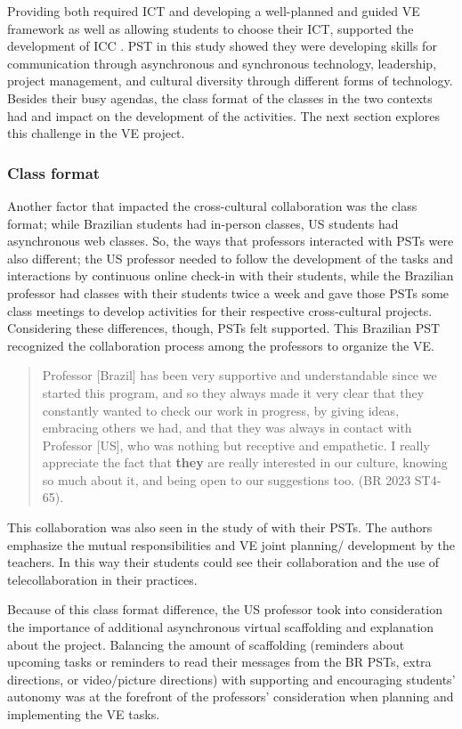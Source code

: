 Providing both required ICT and developing a well-planned and guided VE
framework \cite{gleason2021design} as well as allowing
students to choose their ICT, supported the development of ICC \cite{kolm2022international}. PST in this study showed they were developing
skills for communication through asynchronous and synchronous
technology, leadership, project management, and cultural diversity
through different forms of technology. Besides their busy agendas, the
class format of the classes in the two contexts had and impact on the
development of the activities. The next section explores this challenge
in the VE project.

\subsubsection{Class format}\label{sub-sub-sec-class}

Another factor that impacted the cross-cultural collaboration was the
class format; while Brazilian students had in-person classes, US
students had asynchronous web classes. So, the ways that professors
interacted with PSTs were also different; the US professor needed to
follow the development of the tasks and interactions by continuous
online check-in with their students, while the Brazilian professor had
classes with their students twice a week and gave those PSTs some class
meetings to develop activities for their respective cross-cultural
projects. Considering these differences, though, PSTs felt supported.
This Brazilian PST recognized the collaboration process among the
professors to organize the VE.

\begin{quote}
Professor [Brazil] has been very supportive and understandable
since we started this program, and so they always made it very clear
that they constantly wanted to check our work in progress, by giving
ideas, embracing others we had, and that they was always in contact with
Professor [US], who was nothing but receptive and empathetic. I
really appreciate the fact that \textbf{they} are really interested in
our culture, knowing so much about it, and being open to our suggestions
too. (BR 2023 ST4-65).
\end{quote}

This collaboration was also seen in the study of \textcite[p. 412]{sadler2016twelve} with their PSTs. The authors emphasize the mutual
responsibilities and VE joint planning/ development by the teachers. In
this way their students could see their collaboration and the use of
telecollaboration in their practices.

Because of this class format difference, the US professor took into
consideration the importance of additional asynchronous virtual
scaffolding and explanation about the project. Balancing the amount of
scaffolding (reminders about upcoming tasks or reminders to read their
messages from the BR PSTs, extra directions, or video/picture
directions) with supporting and encouraging students’
autonomy was at the forefront of the professors’
consideration when planning and implementing the VE tasks.




